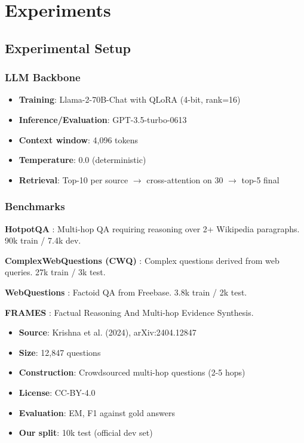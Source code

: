 \documentclass[10pt,twocolumn]{article}
\begin{document}
\section{Experiments}
\label{sec:experiments}

\subsection{Experimental Setup}

\subsubsection{LLM Backbone}
\begin{itemize}
    \item \textbf{Training}: Llama-2-70B-Chat with QLoRA (4-bit, rank=16)
    \item \textbf{Inference/Evaluation}: GPT-3.5-turbo-0613
    \item \textbf{Context window}: 4,096 tokens
    \item \textbf{Temperature}: 0.0 (deterministic)
    \item \textbf{Retrieval}: Top-10 per source $\rightarrow$ cross-attention on 30 $\rightarrow$ top-5 final
\end{itemize}

\subsubsection{Benchmarks}
\label{sec:benchmarks}

\textbf{HotpotQA} \cite{yang2018hotpotqa}: Multi-hop QA requiring reasoning over 2+ Wikipedia paragraphs. 90k train / 7.4k dev.

\textbf{ComplexWebQuestions (CWQ)} \cite{talmor2018complexwebq}: Complex questions derived from web queries. 27k train / 3k test.

\textbf{WebQuestions} \cite{berant2013webquestions}: Factoid QA from Freebase. 3.8k train / 2k test.

\textbf{FRAMES} \cite{krishna2024frames}: Factual Reasoning And Multi-hop Evidence Synthesis.
\begin{itemize}
    \item \textbf{Source}: Krishna et al. (2024), arXiv:2404.12847
    \item \textbf{Size}: 12,847 questions
    \item \textbf{Construction}: Crowdsourced multi-hop questions (2-5 hops)
    \item \textbf{License}: CC-BY-4.0
    \item \textbf{Evaluation}: EM, F1 against gold answers
    \item \textbf{Our split}: 10k test (official dev set)
\end{itemize}
\end{document}
